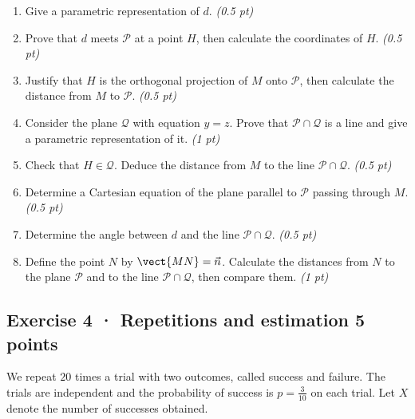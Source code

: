 \begin{enumerate}

\item Give a parametric representation of $d$. \hfill\textit{(0.5 pt)}

\item Prove that $d$ meets $\mathcal P$ at a point $H$, then calculate the coordinates of $H$. \hfill\textit{(0.5 pt)}

\item Justify that $H$ is the orthogonal projection of $M$ onto $\mathcal P$, then calculate the distance from $M$ to $\mathcal P$. \hfill\textit{(0.5 pt)}

\item Consider the plane $\mathcal Q$ with equation $y=z$. Prove that $\mathcal P\cap\mathcal Q$ is a line and give a parametric representation of it. \hfill\textit{(1 pt)}

\item Check that $H\in\mathcal Q$. Deduce the distance from $M$ to the line $\mathcal P\cap\mathcal Q$. \hfill\textit{(0.5 pt)}

\item Determine a Cartesian equation of the plane parallel to $\mathcal P$ passing through $M$. \hfill\textit{(0.5 pt)}

\item Determine the angle between $d$ and the line $\mathcal P\cap\mathcal Q$. \hfill\textit{(0.5 pt)}

\item Define the point $N$ by $\vect{MN}=\vec n$. Calculate the distances from $N$ to the plane $\mathcal P$ and to the line $\mathcal P\cap\mathcal Q$, then compare them. \hfill\textit{(1 pt)}

\end{enumerate}

\subsection*{Exercise 4 · Repetitions and estimation \hfill 5 points}We repeat $20$ times a trial with two outcomes, called success and failure. The trials are independent and the probability of success is $p=\frac{3}{10}$ on each trial. Let $X$ denote the number of successes obtained.

